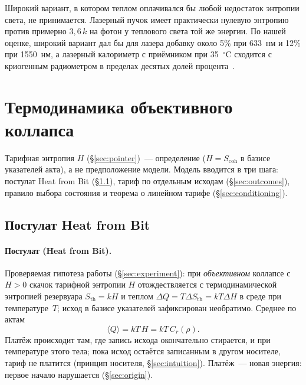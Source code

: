 \documentclass[11pt,a4paper]{article}
\newcommand{\Sref}[1]{\hyperref[#1]{\S\ref{#1}}}
\begin{document}
Широкий вариант, в котором теплом оплачивался бы любой недостаток энтропии света, не принимается. Лазерный пучок имеет практически нулевую энтропию против примерно $3{,}6\,k$ на фотон у теплового света той же энергии. По нашей оценке, широкий вариант дал бы для лазера добавку около 5\% при 633~нм и 12\% при 1550~нм, а лазерный калориметр с приёмником при 35~$^\circ$C сходится с криогенным радиометром в пределах десятых долей процента~\cite{spidell2021}.

\section{Термодинамика объективного коллапса}\label{sec:thermo}

Тарифная энтропия $H$ (\Sref{sec:pointer})~--- определение ($H=S_{\mathrm{coh}}$ в базисе указателей акта), а не предположение модели. Модель вводится в три шага: постулат Heat from Bit (\Sref{sec:postulate}), тариф по отдельным исходам (\Sref{sec:outcomes}), правило выбора состояния и теорема о линейном тарифе (\Sref{sec:conditioning}).

\subsection{Постулат Heat from Bit}\label{sec:postulate}

\paragraph{Постулат (Heat from Bit).}
Проверяемая гипотеза работы (\Sref{sec:experiment}): при \emph{объективном} коллапсе с $H>0$ скачок тарифной энтропии $H$ отождествляется с термодинамической энтропией резервуара $S_{\mathrm{th}}=kH$ и теплом $\Delta Q=T\Delta S_{\mathrm{th}}=kT\Delta H$ в среде при температуре~$T$; исход в базисе указателей зафиксирован необратимо. Среднее по актам
\begin{equation}
\langle Q\rangle = kT\,H = kT\,C_r(\rho).
\label{eq:tariff_mean}
\end{equation}
Платёж происходит там, где запись исхода окончательно стирается, и при температуре этого тела; пока исход остаётся записанным в другом носителе, тариф не платится (принцип носителя, \Sref{sec:intuition}). Платёж~--- новая энергия: первое начало нарушается (\Sref{sec:origin}).
\end{document}
